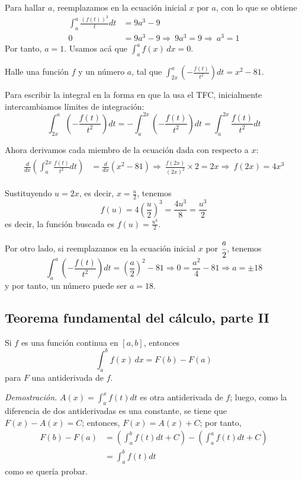 Para hallar $a$, reemplazamos en la ecuación inicial $x$ por $a$, con lo que se obtiene
\begin{align*}
\int_{a}^{a}\frac{\left( f(t) \right) ^{3}}{t}dt&=9a^{3}-9\\
0&=9a^{3}-9\Rightarrow\ 9a^{3}=9\Rightarrow\ a^{3}=1
\end{align*}
Por tanto, $a=1$. Usamos acá que $\int_a^af(x)\,dx=0$.

\begin{ejemplo}
Halle una función $f$ y un número $a$, tal que $\int_{2x}^{a}\left(-\frac{f(t) }{t^{2}}\right)dt=x^{2}-81$.
\end{ejemplo}

Para escribir la integral en la forma en que la usa el TFC, inicialmente intercambiamos límites de integración:
\[
\int_{2x}^{a}\left(-\frac{f(t) }{t^{2}}\right)dt=-\int_{a}^{2x}\left(-\frac{f(t) }{t^{2}}\right)dt=\int_{a}^{2x}\frac{f(t) }{t^{2}}dt
\]

\enlargethispage*{\baselineskip}

Ahora derivamos cada miembro de la ecuación dada con respecto a $x$:
\begin{gather*}
\begin{aligned}
\frac{d}{dx}\left( \int_{a}^{2x}\frac{f(t) }{t^{2}}dt\right) &=\frac{d}{dx}\left( x^{2}-81\right) \Rightarrow\ \frac{f\left( 2x\right)}{\left( 2x\right) ^{2}}\times 2=2x \Rightarrow\ f\left( 2x\right) =4x^{3}
\end{aligned}
\end{gather*}

Sustituyendo $u=2x$, es decir, $x=\frac{u}{2}$, tenemos
\[
f\left(u\right)=4\left(\frac{u}{2}\right)^{3}=\frac{4u^{3}}{8}=\frac{u^{3}}{2}
\]
es decir, la función buscada es $f(u)=\frac{u^3}{2}$.

Por otro lado, si reemplazamos en la ecuación inicial $x$ por $\cfrac{a}{2}$, tenemos
\[
\int_{a}^{a}\left(-\frac{f(t) }{t^{2}}\right)dt=\left(\frac{a}{2}\right)^{2}-81\Rightarrow 0=\frac{a^2}{4}-81\Rightarrow a=\pm 18
\]
y por tanto, un número puede ser $a=18$.

\subsection{Teorema fundamental del cálculo, parte II}

Si $f$ es una función continua en $[a,b]$, entonces
\[
\int_{a}^{b}f(x)\, dx=F(b)-F(a)
\]
para $F$ una antiderivada de $f$.

\textit{Demostración.}  $A(x)=\int_{a}^{x}f(t)dt$ es otra antiderivada de $f$; luego, como la diferencia de dos antiderivadas es una constante, se tiene que $F(x)-A(x)=C$; entonces, $F(x)=A(x) +C$; por tanto,
\begin{align*}
F(b)-F(a)&=\left( \int_{a}^{b}f(t)dt+C\right) -\left(\int_{a}^{a}f(t)dt+C\right) \\
&=\int_{a}^{b}f(t)dt
\end{align*}
como se quería probar.

